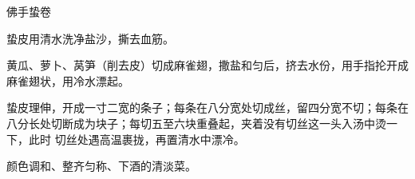 \begin{recipe}{佛手蛰卷}

\ingredients


\preparation

\step 蛰皮用清水洗净盐沙，撕去血筋。

\step 黄瓜、萝卜、莴笋（削去皮）切成麻雀翅，撒盐和匀后，挤去水份，用手指抡开成
麻雀翅状，用冷水漂起。

\step 蛰皮理伸，开成一寸二宽的条子；每条在八分宽处切成丝，留四分宽不切；每条在
八分长处切断成为块子；每切五至六块重叠起，夹着没有切丝这一头入汤中烫一下，此时
切丝处遇高温裹拢，再置清水中漂冷。

\features

颜色调和、整齐匀称、下酒的清淡菜。

\end{recipe}

